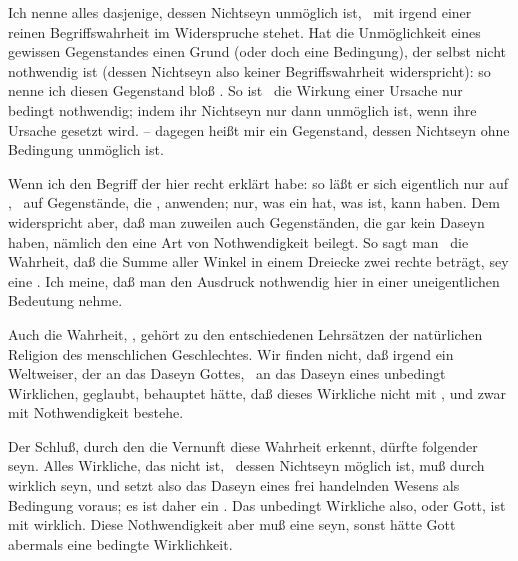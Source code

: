 \begin{aufza} 
\item Ich nenne  alles dasjenige, dessen Nichtseyn unmöglich ist, \dh\ mit irgend einer reinen Begriffswahrheit im Widerspruche stehet. Hat die Unmöglichkeit eines gewissen Gegenstandes einen Grund (oder doch eine Bedingung), der selbst nicht nothwendig ist (dessen Nichtseyn also keiner Begriffswahrheit widerspricht): so nenne ich diesen Gegenstand bloß . So ist \zB\ die Wirkung einer Ursache nur bedingt nothwendig; indem ihr Nichtseyn nur dann unmöglich ist, wenn ihre Ursache gesetzt wird. --  dagegen heißt mir ein Gegenstand, dessen Nichtseyn ohne Bedingung unmöglich ist.
\begin{RWanm}
Wenn ich den Begriff der  hier recht erklärt habe: so läßt er sich eigentlich nur auf , \dh\ auf Gegenstände, die , anwenden; nur, was ein  hat, was ist, kann  haben. Dem widerspricht aber, daß man zuweilen auch Gegenständen, die gar kein Daseyn haben, nämlich den  eine Art von Nothwendigkeit beilegt. So sagt man \zB\ die Wahrheit, daß die Summe aller Winkel in einem Dreiecke zwei rechte beträgt, sey eine . Ich meine, daß man den Ausdruck nothwendig hier in einer uneigentlichen Bedeutung nehme.
\end{RWanm}
\item Auch die Wahrheit, , gehört zu den entschiedenen Lehrsätzen der natürlichen Religion des menschlichen Geschlechtes. Wir finden nicht, daß irgend ein Weltweiser, der an das Daseyn Gottes, \dh\ an das Daseyn eines unbedingt Wirklichen, geglaubt, behauptet hätte, daß dieses Wirkliche nicht mit , und zwar mit  Nothwendigkeit bestehe.
\item Der Schluß, durch den die Vernunft diese Wahrheit erkennt, dürfte folgender seyn. Alles Wirkliche, das nicht  ist, \dh\ dessen Nichtseyn möglich ist, muß durch  wirklich seyn, und setzt also das Daseyn eines frei handelnden Wesens als Bedingung voraus; es ist daher ein . Das unbedingt Wirkliche also, oder Gott, ist mit  wirklich. Diese Nothwendigkeit aber muß eine  seyn, sonst hätte Gott abermals eine bedingte Wirklichkeit.~
\end{aufza}

